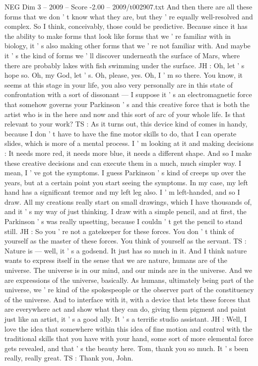 \begin{textsample}{NEG Dim 3 – 2009 – Score -2.00 – 2009/t002907.txt}
And then there are all these forms that we don ' t know what they are, but they ' re equally well-resolved and complex.
So I think, conceivably, those could be predictive.
Because since it has the ability to make forms that look like forms that we ' re familiar with in biology, it ' s also making other forms that we ' re not familiar with.
And maybe it ' s the kind of forms we ' ll discover underneath the surface of Mars, where there are probably lakes with fish swimming under the surface.
JH : Oh, let ' s hope so.
Oh, my God, let ' s.
Oh, please, yes.
Oh, I ' m so there.
You know, it seems at this stage in your life, you also very personally are in this state of confrontation with a sort of dissonant — I suppose it ' s an electromagnetic force that somehow governs your Parkinson ' s and this creative force that is both the artist who is in the here and now and this sort of arc of your whole life.
Is that relevant to your work?
TS : As it turns out, this device kind of comes in handy, because I don ' t have to have the fine motor skills to do, that I can operate slides, which is more of a mental process.
I ' m looking at it and making decisions : It needs more red, it needs more blue, it needs a different shape.
And so I make these creative decisions and can execute them in a much, much simpler way.
I mean, I ' ve got the symptoms.
I guess Parkinson ' s kind of creeps up over the years, but at a certain point you start seeing the symptoms.
In my case, my left hand has a significant tremor and my left leg also.
I ' m left-handed, and so I draw.
All my creations really start on small drawings, which I have thousands of, and it ' s my way of just thinking.
I draw with a simple pencil, and at first, the Parkinson ' s was really upsetting, because I couldn ' t get the pencil to stand still.
JH : So you ' re not a gatekeeper for these forces.
You don ' t think of yourself as the master of these forces.
You think of yourself as the servant.
TS : Nature is — well, it ' s a godsend.
It just has so much in it.
And I think nature wants to express itself in the sense that we are nature, humans are of the universe.
The universe is in our mind, and our minds are in the universe.
And we are expressions of the universe, basically.
As humans, ultimately being part of the universe, we ' re kind of the spokespeople or the observer part of the constituency of the universe.
And to interface with it, with a device that lets these forces that are everywhere act and show what they can do, giving them pigment and paint just like an artist, it ' s a good ally.
It ' s a terrific studio assistant.
JH : Well, I love the idea that somewhere within this idea of fine motion and control with the traditional skills that you have with your hand, some sort of more elemental force gets revealed, and that ' s the beauty here.
Tom, thank you so much.
It ' s been really, really great.
TS : Thank you, John.

\end{textsample}
